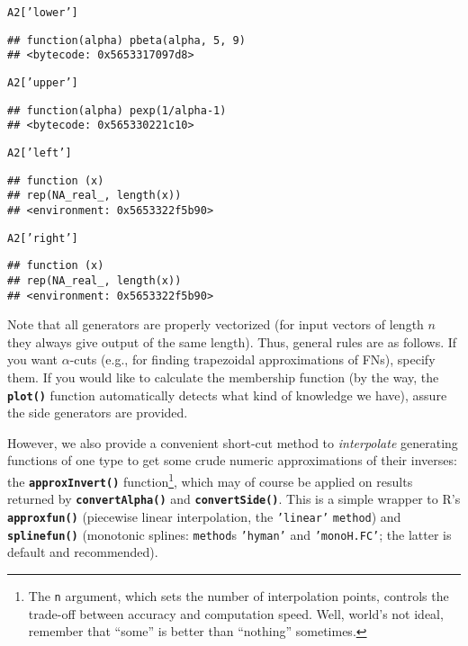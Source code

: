 \documentclass[11pt]{article}\usepackage[]{graphicx}\usepackage[]{color}
\makeatletter
\newcommand{\hlstr}[1]{\textcolor[rgb]{0.192,0.494,0.8}{#1}}%
\newcommand{\hlstd}[1]{\textcolor[rgb]{0.345,0.345,0.345}{#1}}%
\newcommand{\hlkwc}[1]{\textcolor[rgb]{0.333,0.667,0.333}{#1}}%
\newcommand{\hlkwd}[1]{\textcolor[rgb]{0.737,0.353,0.396}{\textbf{#1}}}%
\newenvironment{kframe}{%
 \def\at@end@of@kframe{}%
 \ifinner\ifhmode%
  \def\at@end@of@kframe{\end{minipage}}%
  \begin{minipage}{\columnwidth}%
 \fi\fi%
 \def\FrameCommand##1{\hskip\@totalleftmargin \hskip-\fboxsep
 \colorbox{shadecolor}{##1}\hskip-\fboxsep
     \hskip-\linewidth \hskip-\@totalleftmargin \hskip\columnwidth}%
 \MakeFramed {\advance\hsize-\width
   \@totalleftmargin\z@ \linewidth\hsize
   \@setminipage}}%
 {\par\unskip\endMakeFramed%
 \at@end@of@kframe}
\newenvironment{knitrout}{}{} %
\newcommand{\lang}[1]{\textsf{#1}\xspace}
\newcommand{\R}{\lang{R}}
\newcommand{\func}[1]{\texttt{\hlkwd{#1}}}
\newcommand{\argument}[1]{\texttt{\hlkwc{#1}}}
\newcommand{\str}[1]{\texttt{\hlstr{#1}}}
\makeatother
\begin{document}
\begin{knitrout}\small
{}\color{fgcolor}\begin{kframe}
\begin{alltt}
\hlstd{A2[}\hlstr{'lower'}\hlstd{]}
\end{alltt}
\begin{verbatim}
## function(alpha) pbeta(alpha, 5, 9)
## <bytecode: 0x5653317097d8>
\end{verbatim}
\begin{alltt}
\hlstd{A2[}\hlstr{'upper'}\hlstd{]}
\end{alltt}
\begin{verbatim}
## function(alpha) pexp(1/alpha-1)
## <bytecode: 0x565330221c10>
\end{verbatim}
\begin{alltt}
\hlstd{A2[}\hlstr{'left'}\hlstd{]}
\end{alltt}
\begin{verbatim}
## function (x) 
## rep(NA_real_, length(x))
## <environment: 0x5653322f5b90>
\end{verbatim}
\begin{alltt}
\hlstd{A2[}\hlstr{'right'}\hlstd{]}
\end{alltt}
\begin{verbatim}
## function (x) 
## rep(NA_real_, length(x))
## <environment: 0x5653322f5b90>
\end{verbatim}
\end{kframe}
\end{knitrout}

\noindent
Note that all generators are properly vectorized (for
input vectors of length $n$ they always give output of the
same length).
Thus, general rules are as follows.
If you want $\alpha$-cuts (e.g., for finding
trapezoidal approximations of FNs), specify them.
If you would like to calculate the membership function (by the way,
the \func{plot()} function
automatically detects what kind of knowledge we have),
assure the side generators are provided.


However, we also provide a convenient short-cut method
to \textit{interpolate} generating functions of one type
to get some crude numeric approximations of their inverses:
the \func{approxInvert()}
function\footnote{The
\argument{n} argument, which sets the number of interpolation points,
controls the trade-off between accuracy and computation speed.
Well, world's not ideal, remember that ``some'' is better than ``nothing''
sometimes.}, which may
of course be applied on results returned by
\func{convertAlpha()}
and \func{convertSide()}.
This is a simple wrapper to \R's \func{approxfun()}
(piecewise linear interpolation,
the \str{'{}linear'{}} \argument{method})
and \func{splinefun()} (monotonic
splines: \argument{method}s \str{'{}hyman{}'}
and \str{'{}monoH.FC'{}}; the latter is
default and recommended).
\end{document}
